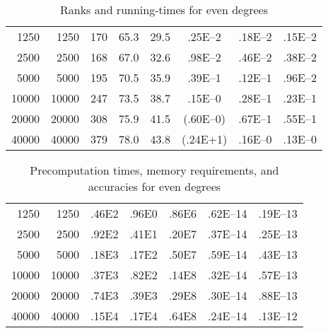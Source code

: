 \documentclass[final,3p,times]{elsarticle}
\begin{document}
\begin{table}[p]
\caption{Ranks and running-times for even degrees}
\label{evens_time}
\vspace{1em}
\begin{tabular*}{\columnwidth}{@{\extracolsep{\fill}}rrcccccc}
 &    &  &  &  &  &  &  \\\hline
 1250 &  1250 &           170 &          65.3 &         29.5 &       .25E--2 &       .18E--2 &       .15E--2 \\\hline
 2500 &  2500 &           168 &          67.0 &         32.6 &       .98E--2 &       .46E--2 &       .38E--2 \\\hline
 5000 &  5000 &           195 &          70.5 &         35.9 &       .39E--1 &       .12E--1 &       .96E--2 \\\hline
10000 & 10000 &           247 &          73.5 &         38.7 &       .15E--0 &       .28E--1 &       .23E--1 \\\hline
20000 & 20000 &           308 &          75.9 &         41.5 &      (.60E--0)&       .67E--1 &       .55E--1 \\\hline
40000 & 40000 &           379 &          78.0 &         43.8 &       (.24E+1)&       .16E--0 &       .13E--0 \\\hline
\end{tabular*}
\end{table}


\begin{table}[p]
\caption{Precomputation times, memory requirements, and accuracies
         for even degrees}
\label{evens_pre}
\vspace{1em}
\begin{tabular*}{\columnwidth}{@{\extracolsep{\fill}}rrccccc}
 &    &  &  &  &  &  \\\hline
 1250 &  1250 &          .46E2 &          .96E0 &         .86E6 &             .62E--14 &             .19E--13 \\\hline
 2500 &  2500 &          .92E2 &          .41E1 &         .20E7 &             .37E--14 &             .25E--13 \\\hline
 5000 &  5000 &          .18E3 &          .17E2 &         .50E7 &             .59E--14 &             .43E--13 \\\hline
10000 & 10000 &          .37E3 &          .82E2 &         .14E8 &             .32E--14 &             .57E--13 \\\hline
20000 & 20000 &          .74E3 &          .39E3 &         .29E8 &             .30E--14 &             .88E--13 \\\hline
40000 & 40000 &          .15E4 &          .17E4 &         .64E8 &             .24E--14 &             .13E--12 \\\hline
\end{tabular*}
\end{table}
\end{document}
